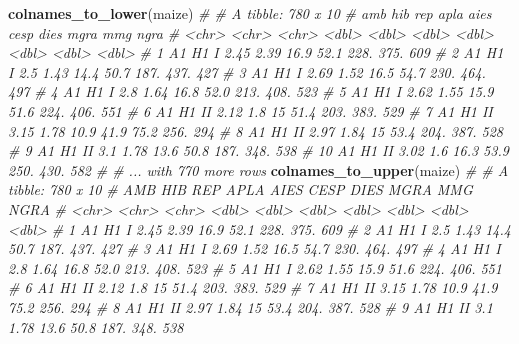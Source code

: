 \documentclass[
]{book}
\newenvironment{Shaded}{\begin{snugshade}}{\end{snugshade}}
\newcommand{\CommentTok}[1]{\textcolor[rgb]{0.56,0.35,0.01}{\textit{#1}}}
\newcommand{\KeywordTok}[1]{\textcolor[rgb]{0.13,0.29,0.53}{\textbf{#1}}}
\newcommand{\NormalTok}[1]{#1}
\numberwithin{equation}{section}
\begin{document}
\begin{Shaded}
\begin{Highlighting}[]
\KeywordTok{colnames\_to\_lower}\NormalTok{(maize)}
\CommentTok{\# \# A tibble: 780 x 10}
\CommentTok{\#    amb   hib   rep    apla  aies  cesp  dies  mgra   mmg  ngra}
\CommentTok{\#    \textless{}chr\textgreater{} \textless{}chr\textgreater{} \textless{}chr\textgreater{} \textless{}dbl\textgreater{} \textless{}dbl\textgreater{} \textless{}dbl\textgreater{} \textless{}dbl\textgreater{} \textless{}dbl\textgreater{} \textless{}dbl\textgreater{} \textless{}dbl\textgreater{}}
\CommentTok{\#  1 A1    H1    I      2.45  2.39  16.9  52.1 228.   375.   609}
\CommentTok{\#  2 A1    H1    I      2.5   1.43  14.4  50.7 187.   437.   427}
\CommentTok{\#  3 A1    H1    I      2.69  1.52  16.5  54.7 230.   464.   497}
\CommentTok{\#  4 A1    H1    I      2.8   1.64  16.8  52.0 213.   408.   523}
\CommentTok{\#  5 A1    H1    I      2.62  1.55  15.9  51.6 224.   406.   551}
\CommentTok{\#  6 A1    H1    II     2.12  1.8   15    51.4 203.   383.   529}
\CommentTok{\#  7 A1    H1    II     3.15  1.78  10.9  41.9  75.2  256.   294}
\CommentTok{\#  8 A1    H1    II     2.97  1.84  15    53.4 204.   387.   528}
\CommentTok{\#  9 A1    H1    II     3.1   1.78  13.6  50.8 187.   348.   538}
\CommentTok{\# 10 A1    H1    II     3.02  1.6   16.3  53.9 250.   430.   582}
\CommentTok{\# \# ... with 770 more rows}
\KeywordTok{colnames\_to\_upper}\NormalTok{(maize)}
\CommentTok{\# \# A tibble: 780 x 10}
\CommentTok{\#    AMB   HIB   REP    APLA  AIES  CESP  DIES  MGRA   MMG  NGRA}
\CommentTok{\#    \textless{}chr\textgreater{} \textless{}chr\textgreater{} \textless{}chr\textgreater{} \textless{}dbl\textgreater{} \textless{}dbl\textgreater{} \textless{}dbl\textgreater{} \textless{}dbl\textgreater{} \textless{}dbl\textgreater{} \textless{}dbl\textgreater{} \textless{}dbl\textgreater{}}
\CommentTok{\#  1 A1    H1    I      2.45  2.39  16.9  52.1 228.   375.   609}
\CommentTok{\#  2 A1    H1    I      2.5   1.43  14.4  50.7 187.   437.   427}
\CommentTok{\#  3 A1    H1    I      2.69  1.52  16.5  54.7 230.   464.   497}
\CommentTok{\#  4 A1    H1    I      2.8   1.64  16.8  52.0 213.   408.   523}
\CommentTok{\#  5 A1    H1    I      2.62  1.55  15.9  51.6 224.   406.   551}
\CommentTok{\#  6 A1    H1    II     2.12  1.8   15    51.4 203.   383.   529}
\CommentTok{\#  7 A1    H1    II     3.15  1.78  10.9  41.9  75.2  256.   294}
\CommentTok{\#  8 A1    H1    II     2.97  1.84  15    53.4 204.   387.   528}
\CommentTok{\#  9 A1    H1    II     3.1   1.78  13.6  50.8 187.   348.   538}

\end{Highlighting}
\end{Shaded}
\end{document}
